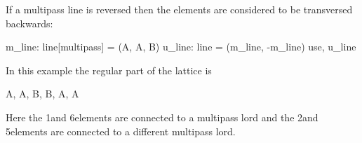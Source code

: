 If a multipass line is reversed then the elements are considered to be
transversed backwards:
\begin{example}
  m_line: line[multipass] = (A, A, B)
  u_line: line = (m_line, -m_line)
  use, u_line
\end{example}
In this example the regular part of the lattice is
\begin{example}
  A, A, B, B, A, A
\end{example}
Here the 1\St and 6\Th elements are connected to a multipass lord and the
2\Nd and 5\Th elements are connected to a different multipass lord.